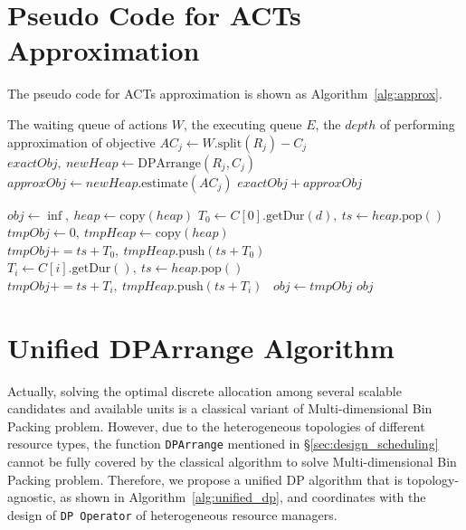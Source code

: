 \section{Pseudo Code for ACTs Approximation}
\label{app:pc_approx}
The pseudo code for ACTs approximation is shown as Algorithm~\ref{alg:approx}.

\begin{algorithm}[h!]
\caption{ACTs Approximation.}
\label{alg:approx}
    \begin{footnotesize}
    \begin{algorithmic}[1]
    \Require The waiting queue of actions $W$, the executing queue $E$, the $depth$ of performing approximation of objective
            \State $AC_j \gets W.\text{split}(R_j) - C_j$ 
            \State $exactObj,~newHeap \gets \text{DPArrange}(R_j, C_j)$
            \State $approxObj \gets newHeap.\text{estimate}(AC_j)$
            \State \Return $exactObj + approxObj$
        \EndFunction

        \Statex
        
        \State $obj \gets \inf, ~heap \gets \text{copy}(heap)$
        \State $T_0 \gets C[0].\text{getDur}(d),~ts \gets heap.\text{pop}()$
        \State $tmpObj \gets 0,~tmpHeap \gets \text{copy}(heap)$
        \State $tmpObj+=ts+T_0,~tmpHeap.\text{push}(ts+T_0)$
        \State $T_i \gets C[i].\text{getDur}(),~ts \gets heap.\text{pop}()$
        \State $tmpObj+=ts+T_i,~tmpHeap.\text{push}(ts+T_i)$
        \EndFor
        ~$obj \gets tmpObj$
        \EndIf
        \EndFor
        \State \Return $obj$
        \EndFunction
    \end{algorithmic}
    \end{footnotesize}

\end{algorithm}






\section{Unified DPArrange Algorithm}
\label{app:udp}

Actually, solving the optimal discrete allocation among several scalable candidates and available units is a classical variant of Multi-dimensional Bin Packing problem.
However, due to the heterogeneous topologies of different resource types, the function \texttt{DPArrange} mentioned in \S\ref{sec:design_scheduling} cannot be fully covered by the classical algorithm to solve Multi-dimensional Bin Packing problem. Therefore, we propose a unified DP algorithm that is topology-agnostic, as shown in Algorithm~\ref{alg:unified_dp}, and coordinates with the design of \texttt{DP Operator} of heterogeneous resource managers.

